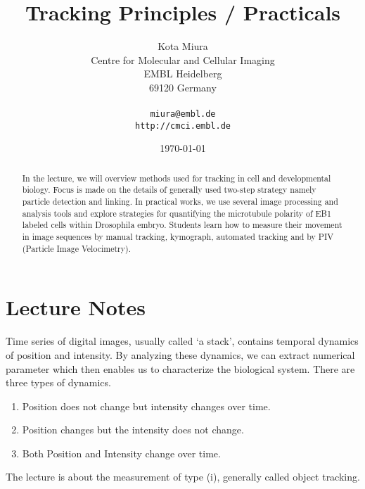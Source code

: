 \documentclass[11pnt]{article}
\begin{document}
\author{Kota Miura\\
  Centre for Molecular and Cellular Imaging\\
  EMBL Heidelberg\\
  69120  Germany\\
  \\
  \texttt{miura@embl.de}\\
  \texttt{http://cmci.embl.de}}
\date{\today}
\title{Tracking Principles / Practicals}
\maketitle

\begin{abstract}
In the lecture, we will overview methods used for tracking in cell and developmental biology. Focus is made on the details of generally used two-step strategy namely particle detection and linking. In practical works, we use several image processing and analysis tools and explore strategies for quantifying the microtubule polarity of EB1 labeled cells within Drosophila embryo. Students learn how to measure their movement in image sequences by manual tracking, kymograph, automated tracking and by PIV (Particle Image Velocimetry). 
\end{abstract}

\section{Lecture Notes}

Time series of digital images, usually called ‘a stack’, contains temporal dynamics of position and intensity. By analyzing these dynamics, we can extract numerical parameter which then enables us to characterize the biological system. There are three types of dynamics. 
\begin{enumerate}
\item Position does not change but intensity changes over time. 
\item Position changes but the intensity does not change. 
\item Both Position and Intensity change over time. 
\end{enumerate}
The lecture is about the measurement of type (i), generally called object tracking. 
\end{document}
